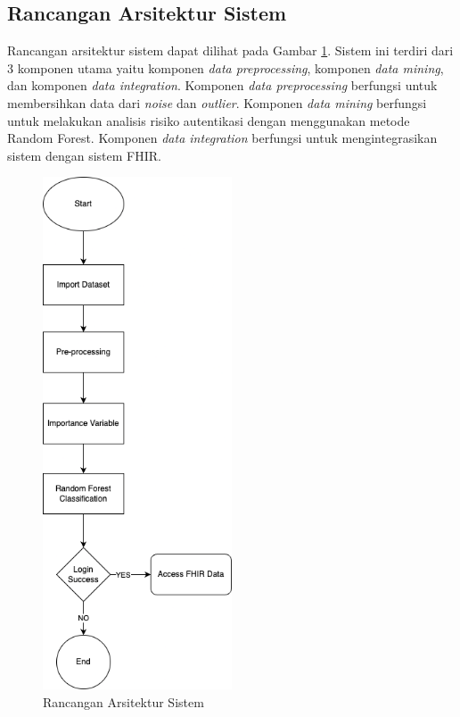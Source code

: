 \subsection{Rancangan Arsitektur Sistem}
Rancangan arsitektur sistem dapat dilihat pada Gambar \ref{fig:arsitektur-sistem}. Sistem ini terdiri dari 3 komponen utama yaitu komponen \textit{data preprocessing}, komponen \textit{data mining}, dan komponen \textit{data integration}. Komponen \textit{data preprocessing} berfungsi untuk membersihkan data dari \textit{noise} dan \textit{outlier}. Komponen \textit{data mining} berfungsi untuk melakukan analisis risiko autentikasi dengan menggunakan metode Random Forest. Komponen \textit{data integration} berfungsi untuk mengintegrasikan sistem dengan sistem FHIR.

\begin{figure}[H]
    \centering
    \includegraphics[width=0.5\textwidth]{BAB_TESIS/IMAGES/diagram-khusus.png}
    \caption{Rancangan Arsitektur Sistem}
    \label{fig:arsitektur-sistem}
\end{figure}

